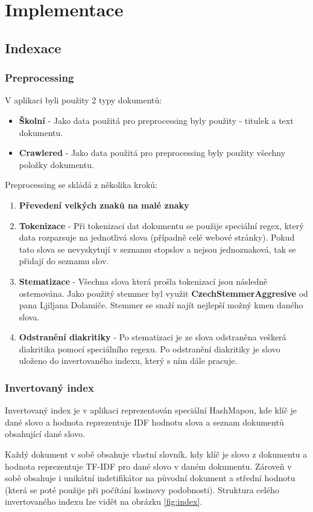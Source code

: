 \documentclass[12pt, a4paper]{article}
\begin{document}
\section{Implementace}
\subsection{Indexace}
\subsubsection{Preprocessing}
V aplikaci byli použity 2 typy dokumentů:
\begin{itemize}
\item \textbf{Školní} - Jako data použitá pro preprocessing byly použity - titulek a text dokumentu.
\item \textbf{Crawlered} - Jako data použitá pro preprocessing byly použity všechny položky dokumentu.
\end{itemize}
Preprocessing se skládá z několika kroků:
\begin{enumerate}
\item \textbf{Převedení velkých znaků na malé znaky}
\item \textbf{Tokenizace} - Při tokenizaci dat dokumentu se použije speciální regex, který data rozparsuje na jednotlivá slova (případně celé webové stránky). Pokud tato slova se nevyskytují v seznamu stopslov a nejsou jednoznaková, tak se přidají do seznamu slov.
\item \textbf{Stematizace} - Všechna slova která prošla tokenizací jsou následně ostemována. Jako použitý stemmer byl využit \textbf{CzechStemmerAggresive} od pana Ljiljana Dolamiče. Stemmer se snaží najít nejlepší možný kmen daného slova.
\item \textbf{Odstranění diakritiky} - Po stematizaci je ze slova odstraněna veškerá diakritika pomocí speciálního regexu. Po odstranění diakritiky je slovo uloženo do invertovaného indexu, který s ním dále pracuje.
\end{enumerate}
\subsubsection{Invertovaný index}
Invertovaný index je v aplikaci reprezentován speciální HashMapou, kde klíč je dané slovo a hodnota reprezentuje IDF hodnotu slova a seznam dokumentů obsahující dané slovo.

Každý dokument v sobě obsahuje vlastní slovník, kdy klíč je slovo z dokumentu a hodnota reprezentuje TF-IDF pro dané slovo v daném dokumentu. Zároveň v sobě obsahuje i unikátní indetifikátor na původní dokument a střední hodnotu (která se poté použije při počítání kosinovy podobnosti). Struktura celého invertovaného indexu lze vidět na obrázku \ref{fig:index}.
\end{document}
